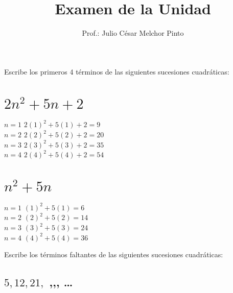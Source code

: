\documentclass[12pt,addpoints]{evalua}
\title{Examen de la Unidad}
\author{Prof.: Julio César Melchor Pinto}
\begin{document}
\begin{multicols}{2}
    
    
\end{multicols}
\begin{questions}\large
    \question[10] Escribe los primeros 4 términos de las siguientes sucesiones cuadráticas:

    \begin{multicols}{2}
        \begin{parts}
            \part { \Large$2n^2+5n+2$} \hfill \fillin[$9,20,35,54$][0cm]

            \begin{solutionbox}{4cm}
                $n=1$ \quad $2(1)^2+5(1)+2=9$ \\
                $n=2$ \quad $2(2)^2+5(2)+2=20$ \\
                $n=3$ \quad $2(3)^2+5(3)+2=35$ \\
                $n=4$ \quad $2(4)^2+5(4)+2=54$
            \end{solutionbox}

            \part {\Large $n^2+5n$} \hfill \fillin[$6,14,24,36$][0cm]

            \begin{solutionbox}{4cm}
                $n=1$ \quad $(1)^2+5(1)=6$ \\
                $n=2$ \quad $(2)^2+5(2)=14$ \\
                $n=3$ \quad $(3)^2+5(3)=24$ \\
                $n=4$ \quad $(4)^2+5(4)=36$
            \end{solutionbox}
        \end{parts}
    \end{multicols}

    \question[10] Escribe los términos faltantes de las siguientes sucesiones cuadráticas:

    \begin{multicols}{2}
        \begin{parts}
            \part { \Large$5,12,21,$ \fillin[32][0.5cm],\fillin[45][0.5cm],\fillin[60][0.5cm], \dots}


\end{parts}
\end{multicols}
\end{questions}
\end{document}
